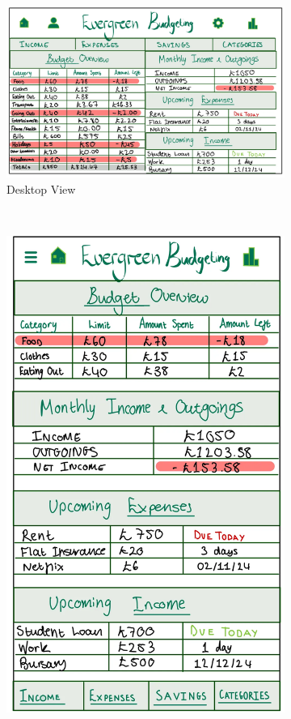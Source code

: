 \documentclass{l4proj}
\begin{document}
\begin{figure}[H] 
    \centering
    \begin{subfigure}[b]{0.6\textwidth}
        \includegraphics[width=\textwidth]{images/Wireframes/wireframe-home-desktop.png}
        \caption{Desktop View}
        \label{fig:syn1}
    \end{subfigure}
    ~
    \begin{subfigure}[b]{0.28\textwidth}
        \includegraphics[width=\textwidth]{images/Wireframes/wireframe-home-phone.png} 

\end{subfigure}
\end{figure}
\end{document}
